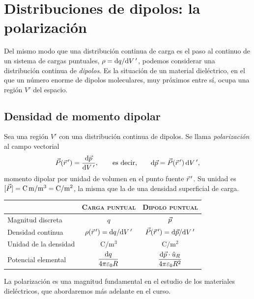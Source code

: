 \section{Distribuciones de dipolos: la polarización}\label{sec:polarizacion}
Del mismo modo que una distribución continua de carga es el paso al continuo de un sistema de cargas puntuales, $\rho=\mathrm{d} q/\mathrm{d} V\,'$,
podemos considerar una distribución continua de \emph{dipolos}. Es la situación de un material dieléctrico, en el que un número enorme de
dipolos moleculares, muy próximos entre sí, ocupa una región $V'$ del espacio.

\subsection{Densidad de momento dipolar}\label{sec:pol-def}
\begin{definicion}[Polarización]\label{def:polarizacion}
Sea una región $V'$ con una distribución continua de dipolos. Se llama \emph{polarización} al campo vectorial
\begin{equation}\label{eq:polarizacion}
  \vec{P}(\vec{r}\,')=\frac{\mathrm{d}\vec{p}}{\mathrm{d} V\,'},\qquad\text{es decir,}\qquad \mathrm{d}\vec{p}=\vec{P}(\vec{r}\,')\,\mathrm{d} V\,' ,
\end{equation}
momento dipolar por unidad de volumen en el punto fuente $\vec{r}\,'$. Su unidad es $[\vec{P}]=\mathrm{C\,m}/\mathrm{m^{3}}=\mathrm{C/m^{2}}$, la misma que la de una
densidad superficial de carga.
\end{definicion}

\begin{observacion}\label{obs:analogia}
\begin{center}\vspace{2pt}
\renewcommand{\arraystretch}{1.25}
\begin{tabular}{@{}lcc@{}}
  \toprule
  & \textsc{Carga puntual} & \textsc{Dipolo puntual}\\
  \midrule
  Magnitud discreta & $q$ & $\vec{p}$\\
  Densidad continua & $\rho(\vec{r}\,')=\mathrm{d} q/\mathrm{d} V\,'$ & $\vec{P}(\vec{r}\,')=\mathrm{d}\vec{p}/\mathrm{d} V\,'$\\
  Unidad de la densidad & $\mathrm{C/m^{3}}$ & $\mathrm{C/m^{2}}$\\
  Potencial elemental & $\dfrac{\mathrm{d} q}{4\pi\varepsilon_{0} R}$ & $\dfrac{\mathrm{d}\vec{p}\cdot\hat{u}_{R}}{4\pi\varepsilon_{0} R^{2}}$\\
  \bottomrule
\end{tabular}
\end{center}
\vspace{2pt}
La polarización es una magnitud fundamental en el estudio de los materiales dieléctricos, que abordaremos más adelante en el curso.
\end{observacion}

